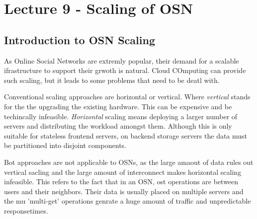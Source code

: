 \section{Lecture 9 - Scaling of OSN} %
\label{sec:lecture_9_scaling_of_osn}

\subsection{Introduction to OSN Scaling}
As Online Social Networks are extremly popular,
their demand for a scalable ifrastructure to support their grwoth is natural.
Cloud COmputing can provide such scaling,
but it leads to some problems that need to be deatl with.

Conventional scaling approaches are horizontal or vertical.
Where \emph{vertical} stands for the the upgrading the existing hardware.
This can be expensive and be techincally infeasible.
\emph{Horizontal} scaling means deploying a larger number of servers
and distributing the workload amongst them.
Although this is only suitable for stateless frontend servers,
on backend storage servers the data must be partitioned into disjoint components.

Bot approaches are not applicable to OSNs,
as the large amaout of data rules out vertical sacling 
and the large amount of interconnect makes horizontal scaling infeasible.
This refers to the fact that in an OSN,
ost operations are between users and their neighbors.
Their data is usually placed on multiple servers
and the mu 'multi-get' operations genrate a huge amount of traffic
and unpredictable responsetimes.
